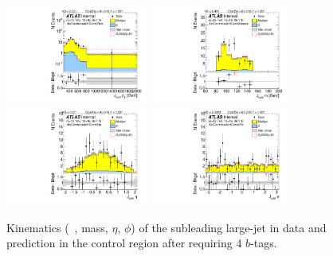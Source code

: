 \begin{figure}[htb!]
\begin{center}
\includegraphics[width=0.41\textwidth,angle=-90]{figures/boosted/Control/b77_FourTag_Control_sublHCand_Pt_m_1.pdf}
\includegraphics[width=0.41\textwidth,angle=-90]{figures/boosted/Control/b77_FourTag_Control_sublHCand_Mass_s.pdf}\\
\includegraphics[width=0.41\textwidth,angle=-90]{figures/boosted/Control/b77_FourTag_Control_sublHCand_Eta.pdf}
\includegraphics[width=0.41\textwidth,angle=-90]{figures/boosted/Control/b77_FourTag_Control_sublHCand_Phi.pdf}
  \caption{Kinematics (\pt~, mass, $\eta$, $\phi$) of the subleading large-\R jet in data and prediction in the control region after requiring 4 $b$-tags. }
  \label{fig:boosted-4b-control-ak10-subl}
\end{center}
\end{figure}

